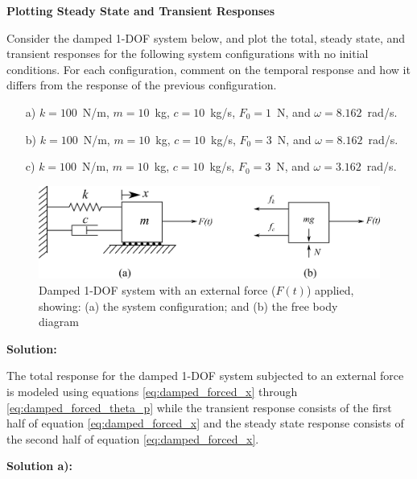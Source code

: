 \documentclass[12pt,letter]{article}
\begin{document}
	\begin{example}
	\label{ex:homogeneous_and_particular_solutions_in_resonance}		
		\textbf{Plotting Steady State and Transient Responses}
		
		\noindent Consider the damped 1-DOF system below, and plot the total, steady state, and transient responses for the following system configurations with no initial conditions. For each configuration, comment on the temporal response and how it differs from the response of the previous configuration.    
		
		\begin{itemize}
		\item[a)] $k=100$~N/m, $m=10$~kg,  $c=10$~kg/s, $F_0=1$~N, and $\omega = 8.162$~rad/s.
		\item[b)] $k=100$~N/m, $m=10$~kg,  $c=10$~kg/s, $F_0=3$~N, and $\omega = 8.162$~rad/s.
		\item[c)] $k=100$~N/m, $m=10$~kg,  $c=10$~kg/s, $F_0=3$~N, and $\omega = 3.162$~rad/s.
		\end{itemize}
		
		\begin{figure}[H]
			\centering
			\includegraphics[]{../figures/1-DOF-spring_dashpot_mass_horizontal_forced_FBD.png}
			\caption{Damped 1-DOF system with an external force ($F(t)$) applied, showing: (a) the system configuration; and (b) the free body diagram}
		\end{figure}
		
		\noindent\textbf{Solution:} 

		\noindent The total response for the damped 1-DOF system subjected to an external force is modeled using equations \ref{eq:damped_forced_x} through \ref{eq:damped_forced_theta_p} while the transient response consists of the first half of equation \ref{eq:damped_forced_x} and the steady state response consists of the second half of equation \ref{eq:damped_forced_x}.  
		
		
		\noindent\textbf{Solution a):} 
		

\end{example}
\end{document}
